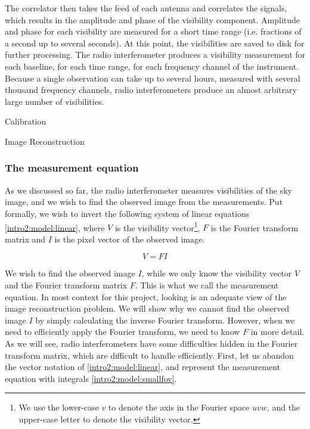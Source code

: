 The correlator then takes the feed of each antenna and correlates the signals, which results in the amplitude and phase of the visibility component. Amplitude and phase for each visibility are measured for a short time range (i.e. fractions of a second up to several seconds). At this point, the visibilities are saved to disk for further processing. The radio interferometer produces a visibility measurement for each baseline, for each time range, for each frequency channel of the instrument. Because a single observation can take up to several hours, measured with several thousand frequency channels, radio interferometers produce an almost arbitrary large number of visibilities.

Calibration

Image Reconstruction



\subsubsection{The measurement equation}
As we discussed so far, the radio interferometer measures visibilities of the sky image, and we wish to find the observed image from the measurements. Put formally, we wish to invert the following system of linear equations \eqref{intro2:model:linear}, where $V$ is the visibility vector\footnote{We use the lower-case $v$ to denote the axis in the Fourier space $uvw$, and the upper-case letter to denote the visibility vector.}, $F$ is the Fourier transform matrix and $I$ is the pixel vector of the observed image.

\begin{equation}\label{intro2:model:linear}
V = F I
\end{equation}

We wish to find the observed image $I$, while we only know the visibility vector $V$ and the Fourier transform matrix $F$. This is what we call the measurement equation. In most context for this project, looking is an adequate view of the image reconstruction problem. We will show why we cannot find the observed image $I$ by simply calculating the inverse Fourier transform. However, when we need to efficiently apply the Fourier transform, we need to know $F$ in more detail. As we will see, radio interferometers have some difficulties hidden in the Fourier transform matrix, which are difficult to handle efficiently. First, let us abandon the vector notation of \eqref{intro2:model:linear}, and represent the measurement equation with integrals \eqref{intro2:model:smallfov}.

